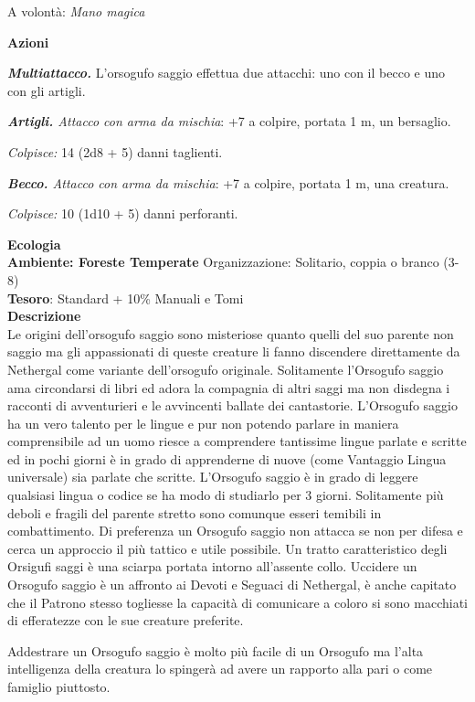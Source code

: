 \begin{multicols}{2}
	A volontà: \textit{Mano magica}

	\textbf{Azioni}

	\textit{\textbf{Multiattacco.}} L'orsogufo saggio effettua due attacchi: uno con il becco e uno con gli artigli.

	\textit{\textbf{Artigli.} Attacco con arma da mischia}: +7 a colpire, portata 1 m, un bersaglio.

	\textit{Colpisce:} 14 (2d8 + 5) danni taglienti.

	\textit{\textbf{Becco.} Attacco con arma da mischia}: +7 a colpire, portata 1 m, una creatura.

	\textit{Colpisce:} 10 (1d10 + 5) danni perforanti.

	\textbf{Ecologia}\\
	\textbf{Ambiente: Foreste Temperate}
	Organizzazione: Solitario, coppia o branco (3-8)\\
	\textbf{Tesoro}: Standard + 10\% Manuali e Tomi\\
	\textbf{Descrizione}\\
	Le origini dell'orsogufo saggio sono misteriose quanto quelli del suo parente non saggio ma gli appassionati di queste creature li fanno discendere direttamente da Nethergal come variante dell'orsogufo originale.
	Solitamente l'Orsogufo saggio ama circondarsi di libri ed adora la compagnia di altri saggi ma non disdegna i racconti di avventurieri e le avvincenti ballate dei cantastorie. L'Orsogufo saggio ha un vero talento per le lingue e pur non potendo parlare in maniera comprensibile ad un uomo riesce a comprendere tantissime lingue parlate e scritte ed in pochi giorni è in grado di apprenderne di nuove (come Vantaggio Lingua universale) sia parlate che scritte. L'Orsogufo saggio è in grado di leggere qualsiasi lingua o codice se ha modo di studiarlo per 3 giorni.
	Solitamente più deboli e fragili del parente stretto sono comunque esseri temibili in combattimento.
	Di preferenza un Orsogufo saggio non attacca se non per difesa e cerca un approccio il più tattico e utile possibile. Un tratto caratteristico degli Orsigufi saggi è una sciarpa portata intorno all'assente collo. Uccidere un Orsogufo saggio è un affronto ai Devoti e Seguaci di Nethergal, è anche capitato che il Patrono stesso togliesse la capacità di comunicare a coloro si sono macchiati di efferatezze con le sue creature preferite.

	Addestrare un Orsogufo saggio è molto più facile di un Orsogufo ma l'alta intelligenza della creatura lo spingerà ad avere un rapporto alla pari o come famiglio piuttosto.


\end{multicols}
